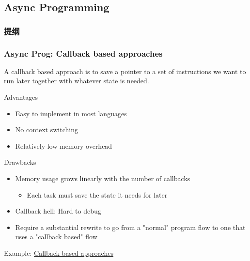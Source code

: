 \subsection{Async Programming}
\begin{frame}
    \frametitle{提纲} %
    \tableofcontents %

\end{frame}
\begin{frame}[fragile]
    \frametitle{Async Prog: Callback based approaches}
% 
% 
 A callback based approach is to save a pointer to a set of instructions we want to run later together with whatever state is needed.
 
{\color{red}Advantages}
 
     \begin{itemize}
         \item Easy to implement in most languages
         \item No context switching
         \item Relatively low memory overhead
     \end{itemize}
 
{\color{red}Drawbacks}
 
     \begin{itemize}
         \item Memory usage grows linearly with the number of callbacks
     	\begin{itemize}
     	    \item Each task must save the state it needs for later
     	\end{itemize}
         \item Callback hell: Hard to debug
         \item Require a substantial rewrite to go from a "normal" program flow to one that uses a "callback based" flow
     \end{itemize}
 
Example: \href{https://cfsamson.github.io/books-futures-explained/0_background_information.html#callback-based-approaches}{Callback based approaches}
 
\end{frame}



